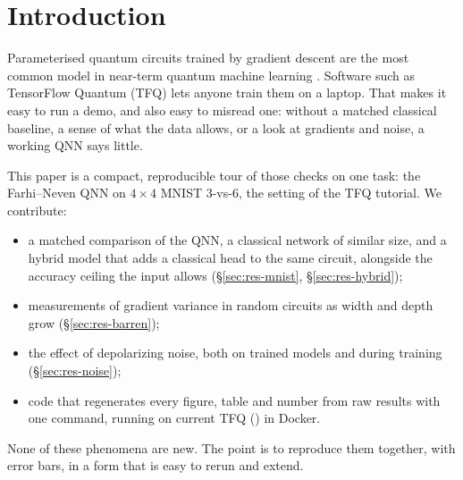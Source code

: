 \section{Introduction}
\label{sec:intro}

Parameterised quantum circuits trained by gradient descent are the most common model in near-term
quantum machine learning \citep{preskill2018nisq,cerezo2021vqa}. Software such as TensorFlow Quantum
(TFQ) \citep{broughton2020tfq} lets anyone train them on a laptop. That makes it easy to run a demo, and
also easy to misread one: without a matched classical baseline, a sense of what the data allows, or a
look at gradients and noise, a working QNN says little.

This paper is a compact, reproducible tour of those checks on one task: the Farhi--Neven QNN
\citep{farhi2018classification} on $4\times4$ MNIST 3-vs-6, the setting of the TFQ tutorial. We contribute:
\begin{itemize}
  \item a matched comparison of the QNN, a classical network of similar size, and a hybrid model that
        adds a classical head to the same circuit, alongside the accuracy ceiling the input allows
        (\S\ref{sec:res-mnist}, \S\ref{sec:res-hybrid});
  \item measurements of gradient variance in random circuits as width and depth grow
        (\S\ref{sec:res-barren});
  \item the effect of depolarizing noise, both on trained models and during training
        (\S\ref{sec:res-noise});
  \item code that regenerates every figure, table and number from raw results with one command,
        running on current TFQ (\valVerTFQ) in Docker.
\end{itemize}
None of these phenomena are new. The point is to reproduce them together, with error bars, in a form
that is easy to rerun and extend.

